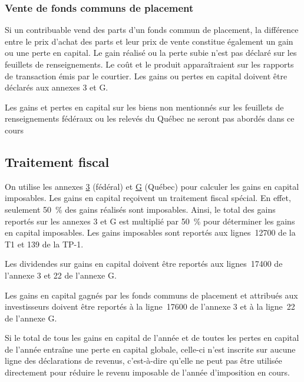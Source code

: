 \subsubsection{Vente de fonds communs de placement}
Si un contribuable vend des parts d'un fonds commun de placement, la différence entre le prix d'achat des parts et leur prix de vente constitue également un gain ou une perte en capital. Le gain réalisé ou la perte subie n'est pas déclaré sur les feuillets de renseignements. Le coût et le produit apparaîtraient sur les rapports de transaction émis par le courtier. Les gains ou pertes en capital doivent être déclarés aux annexes 3 et G.

Les gains et pertes en capital sur les biens non mentionnés sur les feuillets de renseignements fédéraux ou les relevés du Québec ne seront pas abordés dans ce cours


\subsection{Traitement fiscal}
On utilise les annexes \href{https://www.canada.ca/fr/agence-revenu/services/formulaires-publications/trousses-impot-toutes-annees-imposition/trousse-generale-impot-prestations/5000-s3.html}{3} (fédéral) et \href{https://www.revenuquebec.ca/documents/fr/formulaires/tp/2023-12/TP-1.D.G%282023-12%29.pdf}{G} (Québec) pour calculer les gains en capital imposables. Les gains en capital reçoivent un traitement fiscal spécial. En effet, seulement 50~\% des gains réalisés sont imposables. Ainsi, le total des gains reportés sur les annexes 3 et G est multiplié par 50~\% pour déterminer les gains en capital imposables. Les gains imposables sont reportés aux lignes~12700 de la T1 et 139 de la TP-1.

\begin{note}
	Les dividendes sur gains en capital doivent être reportés aux lignes~17400 de l'annexe 3 et 22 de l'annexe G.
	
	Les gains en capital gagnés par les fonds communs de placement et attribués aux investisseurs doivent être reportés à la ligne~17600 de l'annexe 3 et à la ligne~22 de l'annexe G.
\end{note}

Si le total de tous les gains en capital de l'année et de toutes les pertes en capital de l'année entraîne une perte en capital globale, celle-ci n'est inscrite sur aucune ligne des déclarations de revenus, c'est-à-dire qu'elle ne peut pas être utilisée directement pour réduire le revenu imposable de l'année d'imposition en cours.

